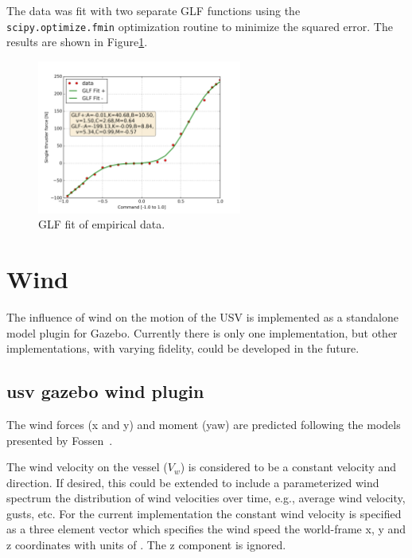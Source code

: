 \documentclass[11pt]{article}
\begin{document}
The data was fit with two separate GLF functions using the \verb+scipy.optimize.fmin+ optimization routine to minimize the squared error.  The results are shown in Figure\ref{f:fit}.

\begin{figure}[h]
  \centering
  \includegraphics[width=0.6\textwidth]{images/wamv_glf_annote.png}
  \caption{GLF fit of empirical data.}
  \label{f:fit}
\end{figure}


\section{Wind}

The influence of wind on the motion of the USV is implemented as a standalone model plugin for Gazebo.  Currently there is only one implementation, but other implementations, with varying fidelity, could be developed in the future.

\subsection{usv gazebo wind plugin}

The wind forces (x and y) and moment (yaw) are predicted following the models presented by Fossen~\cite{fossen94guidance}.

The wind velocity on the vessel ($V_w$) is considered to be a constant velocity and direction.  If desired, this could be extended to include a parameterized wind spectrum the distribution of wind velocities over time, e.g., average wind velocity, gusts, etc.  For the current implementation the constant wind velocity is specified as a three element vector which specifies the wind speed the world-frame x, y and z coordinates with units of .  The z component is ignored.
\end{document}
